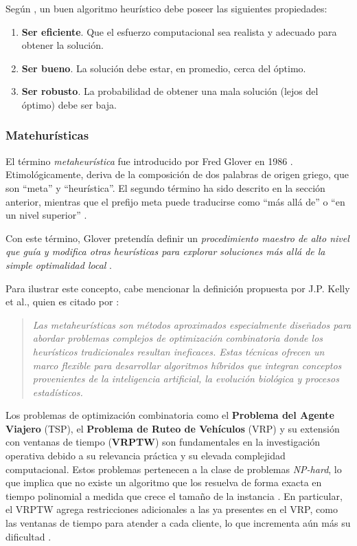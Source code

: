 \documentclass[12pt,titlepage,twoside,openright]{book}
\begin{document}
Según \citep{antonioSuarez2014}, un buen algoritmo heurístico debe poseer las siguientes propiedades:

\begin{enumerate}[label=\alph*.]
	\item \textbf{Ser eficiente}. Que el esfuerzo computacional sea realista y adecuado para obtener la solución.
	\item \textbf{Ser bueno}. La solución debe estar, en promedio, cerca del óptimo.
	\item \textbf{Ser robusto}. La probabilidad de obtener una mala solución (lejos del óptimo) debe ser baja.
\end{enumerate}

\subsubsection{Matehurísticas}



El término \textit{metaheurística} fue introducido por Fred Glover en 1986 \citep{antonioSuarez2014}. Etimológicamente, deriva de la composición de dos palabras de origen griego, que son “meta” y “heurística”. El segundo término ha sido descrito en la sección anterior, mientras que el prefijo meta puede traducirse como “más allá de” o “en un nivel superior” \citep{duarte2007metaheuristicas}.

Con este término, Glover pretendía definir un \textit{procedimiento maestro de alto nivel que guía y modifica otras heurísticas para explorar soluciones más allá de la simple optimalidad local} \citep{duarte2007metaheuristicas}.

Para ilustrar este concepto, cabe mencionar la definición propuesta por J.P. Kelly et al., quien es citado por \citep{duarte2007metaheuristicas}:

\begin{quote}
	\textit{Las metaheurísticas son métodos aproximados especialmente diseñados para abordar problemas complejos de optimización combinatoria donde los heurísticos tradicionales resultan ineficaces. Estas técnicas ofrecen un marco flexible para desarrollar algoritmos híbridos que integran conceptos provenientes de la inteligencia artificial, la evolución biológica y procesos estadísticos.}
\end{quote}

Los problemas de optimización combinatoria como el \textbf{Problema del Agente Viajero} (TSP), el \textbf{Problema de Ruteo de Vehículos} (VRP) y su extensión con ventanas de tiempo (\textbf{VRPTW}) son fundamentales en la investigación operativa debido a su relevancia práctica y su elevada complejidad computacional. Estos problemas pertenecen a la clase de problemas \textit{NP-hard}, lo que implica que no existe un algoritmo que los resuelva de forma exacta en tiempo polinomial a medida que crece el tamaño de la instancia \citep{garey1979computers}. En particular, el VRPTW agrega restricciones adicionales a las ya presentes en el VRP, como las ventanas de tiempo para atender a cada cliente, lo que incrementa aún más su dificultad \citep{toth2014}. 
\end{document}

